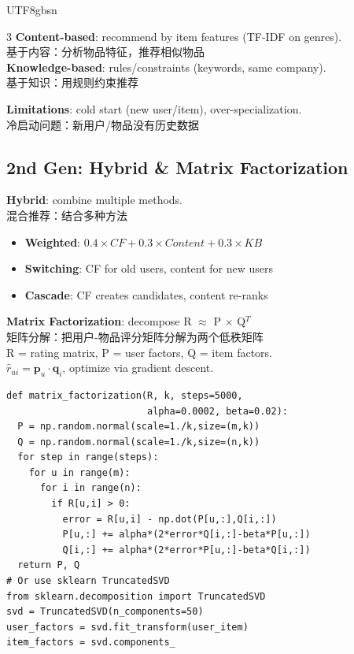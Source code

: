 \documentclass[9pt,landscape,a4paper]{article}
\newcommand{\zhint}[1]{{\scriptsize\color{gray!70!black}#1}}
\begin{document}
\begin{CJK}{UTF8}{gbsn}
\begin{multicols}{3}
\textbf{Content-based}: recommend by item features (TF-IDF on genres).\\
\zhint{基于内容：分析物品特征，推荐相似物品}\\
\textbf{Knowledge-based}: rules/constraints (keywords, same company).\\
\zhint{基于知识：用规则约束推荐}

\textbf{Limitations}: cold start (new user/item), over-specialization.\\
\zhint{冷启动问题：新用户/物品没有历史数据}

\subsection{2nd Gen: Hybrid \& Matrix Factorization}

\textbf{Hybrid}: combine multiple methods.\\
\zhint{混合推荐：结合多种方法}
\begin{itemize}[leftmargin=8pt,itemsep=0pt,topsep=0pt]
\item \textbf{Weighted}: $0.4\times CF + 0.3\times Content + 0.3\times KB$
\item \textbf{Switching}: CF for old users, content for new users
\item \textbf{Cascade}: CF creates candidates, content re-ranks
\end{itemize}

\textbf{Matrix Factorization}: decompose R $\approx$ P $\times$ Q$^T$\\
\zhint{矩阵分解：把用户-物品评分矩阵分解为两个低秩矩阵}\\
R = rating matrix, P = user factors, Q = item factors.\\
$\hat{r}_{ui} = \mathbf{p}_u \cdot \mathbf{q}_i$, optimize via gradient descent.

\begin{lstlisting}
def matrix_factorization(R, k, steps=5000,
                         alpha=0.0002, beta=0.02):
  P = np.random.normal(scale=1./k,size=(m,k))
  Q = np.random.normal(scale=1./k,size=(n,k))
  for step in range(steps):
    for u in range(m):
      for i in range(n):
        if R[u,i] > 0:
          error = R[u,i] - np.dot(P[u,:],Q[i,:])
          P[u,:] += alpha*(2*error*Q[i,:]-beta*P[u,:])
          Q[i,:] += alpha*(2*error*P[u,:]-beta*Q[i,:])
  return P, Q
# Or use sklearn TruncatedSVD
from sklearn.decomposition import TruncatedSVD
svd = TruncatedSVD(n_components=50)
user_factors = svd.fit_transform(user_item)
item_factors = svd.components_
\end{lstlisting}


\end{multicols}
\end{CJK}
\end{document}

